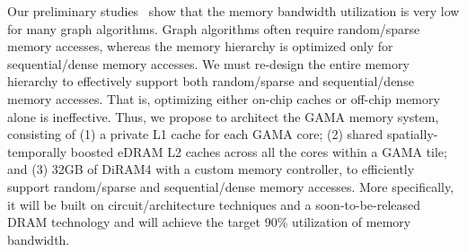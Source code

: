 



\noindent
Our preliminary studies~\cite{Xu2014, luo2010effective, kim2015compiler, kim2015locality} show that the memory bandwidth utilization is very low for many graph algorithms.
Graph algorithms often require random/sparse memory accesses, whereas the memory hierarchy is optimized only for sequential/dense memory accesses.
We must re-design the entire memory hierarchy to effectively support both random/sparse and sequential/dense memory accesses.
That is, optimizing either on-chip caches or off-chip memory alone is ineffective.
Thus, we propose to architect the GAMA memory system, consisting of (1) a private L1 cache for each GAMA core; (2) shared spatially-temporally boosted eDRAM L2 caches across all the cores within a GAMA tile; and (3) 32GB of DiRAM4 with a custom memory controller, to efficiently support random/sparse and sequential/dense memory accesses.
More specifically, it will be built on circuit/architecture techniques and a soon-to-be-released DRAM technology and will achieve the target 90\% utilization of memory bandwidth. 


